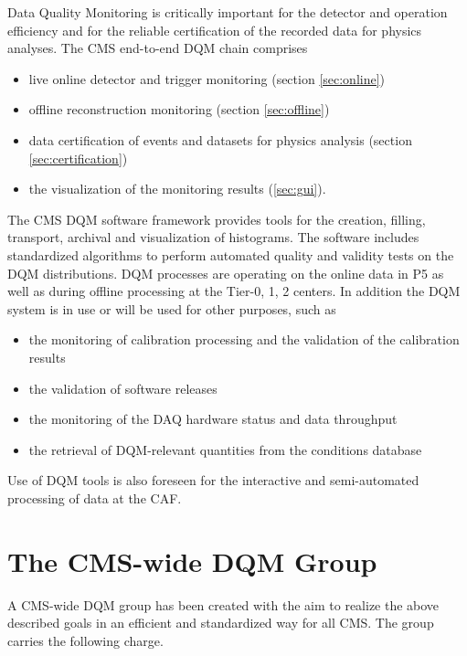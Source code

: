 \documentclass[a4paper]{cmspaper}
\begin{document}
Data Quality Monitoring is critically important for the detector and operation efficiency
and for the reliable certification of the recorded data for physics analyses. 
The CMS end-to-end DQM chain comprises
\begin{itemize}
\item live online detector and trigger monitoring (section \ref{sec:online})
\item offline reconstruction monitoring (section \ref{sec:offline})
\item data certification of events and datasets for physics analysis (section
\ref{sec:certification})
\item the visualization of the monitoring results (\ref{sec:gui}).
\end{itemize}

The CMS DQM software framework provides tools for the creation, filling, transport, archival and visualization of histograms. The software includes standardized algorithms to perform automated quality and validity tests on the DQM distributions. 
DQM processes are operating on the online data in P5 as well as during offline processing at the Tier-0, 1, 2 centers. 
In addition the DQM system is in use or will be used for other purposes, such as
\begin{itemize}
\item the monitoring of calibration processing and the validation of the calibration results
\item the validation of software releases
\item the monitoring of the DAQ hardware status and data throughput
\item the retrieval of DQM-relevant quantities from the conditions database
\end{itemize}
Use of DQM tools is also foreseen for the interactive and semi-automated processing of data at the CAF. 

\section{The CMS-wide DQM Group} 
\label{sec:charge}

A CMS-wide DQM group has been created with the aim to realize the above described goals 
in an efficient and standardized way for all CMS. The group carries the following charge.
\end{document}
